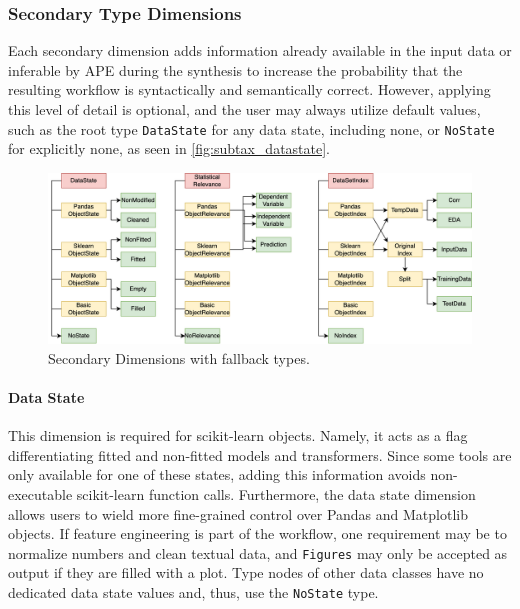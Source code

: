 \subsubsection{Secondary Type Dimensions}
Each secondary dimension adds information already available in the input data or inferable by APE during the synthesis to increase the probability that the resulting workflow is syntactically and semantically correct. However, applying this level of detail is optional, and the user may always utilize default values, such as the root type \verb|DataState| for any data state, including none, or \verb|NoState| for explicitly none, as seen in \autoref{fig:subtax_datastate}.

\begin{figure}[h]
    \centering
    \includegraphics[width=\linewidth]{Tex/images/OtherDimsSimple.png}
    \caption{Secondary Dimensions with fallback types.}
    \label{fig:subtax_datastate}
\end{figure}
\paragraph{Data State}\label{par:data_state}
This dimension is required for scikit-learn objects. Namely, it acts as a flag differentiating fitted and non-fitted models and transformers. Since some tools are only available for one of these states, adding this information avoids non-executable scikit-learn function calls. Furthermore, the data state dimension allows users to wield more fine-grained control over Pandas and Matplotlib objects. If feature engineering is part of the workflow, one requirement may be to normalize numbers and clean textual data, and \texttt{Figures} may only be accepted as output if they are filled with a plot. Type nodes of other data classes have no dedicated data state values and, thus, use the \verb|NoState| type.

